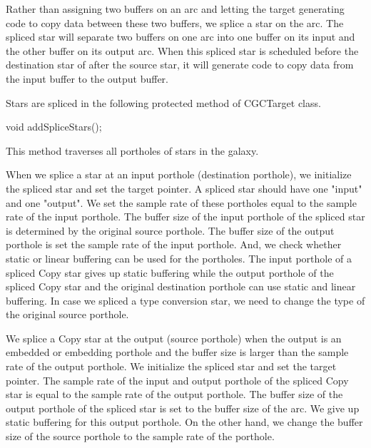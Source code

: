 Rather than assigning two buffers on an arc and letting the target
generating code to copy data between these two buffers, we splice
a star on the arc. The spliced star will separate two buffers on one arc
into one buffer on its input and the other buffer on its output arc.
When this spliced star is scheduled before the destination star of after
the source star,
it will generate code to copy data from the input buffer to the output buffer.

Stars are spliced in the following protected method of CGCTarget class.

\begin{example}
void addSpliceStars();
\end{example}

This method traverses all portholes of stars in the galaxy.

When we splice a star at an input porthole (destination porthole), we
initialize the spliced star and set the target pointer. A spliced star should
have one "input" and one "output". We set the sample rate of these portholes
equal to the sample rate of the input porthole. The buffer size of the input
porthole of the spliced star is determined by the original source porthole.
The buffer size of the output porthole is set the sample rate of the
input porthole. And, we check whether static or linear buffering can be used
for the portholes. The input porthole of a spliced Copy star gives up
static buffering while the output porthole of the spliced Copy star and
the original destination porthole can use static and linear buffering.
In case we spliced a type conversion star, we need to change the type of the
original source porthole.

We splice a Copy star at the output (source porthole) when the output 
is an embedded or
embedding porthole and the buffer size is larger than the sample rate of
the output porthole. We initialize the spliced star and set the target
pointer. The sample rate of the input and output porthole of
the spliced Copy star is equal to the sample rate of the output porthole.
The buffer size of the output porthole of the spliced star is set to the
buffer size of the arc. We give up static buffering for this output
porthole. On the other hand, we change the buffer size of
the source porthole to the sample rate of the porthole. 

